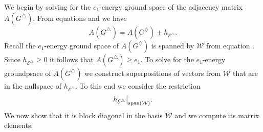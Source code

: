 \documentclass[../thesis-main/thesis-main]{subfiles}
\begin{document}
We begin by solving for the $e_{1}$-energy ground space of the adjacency matrix $A(G^{\triangle})$. From equations  and  we have
\begin{equation}
A(G^{\triangle})=A(G^{\diamondsuit})+h_{\mathcal{E}^{\triangle}}.\label{eq:A_g_diamond_triangle}
\end{equation}
Recall the $e_{1}$-energy ground space of $A(G^{\diamondsuit})$ is spanned by $\mathcal{W}$ from equation . Since $h_{\mathcal{E}^{\triangle}}\geq0$ it follows that $A(G^{\triangle})\geq e_{1}$. To solve for the $e_{1}$-energy groundpsace of $A(G^{\triangle})$ we construct superpositions of vectors from $\mathcal{W}$ that are in the nullspace of $h_{\mathcal{E}^{\triangle}}$. To this end we consider the restriction
\begin{equation}
h_{\mathcal{E}^{\triangle}}\big|_{\operatorname{span}\left(\mathcal{W}\right)}.\label{eq:restriction_h_triangle}
\end{equation}
We now show that it is block diagonal in the basis $\mathcal{W}$ and we compute its matrix elements.
\end{document}

